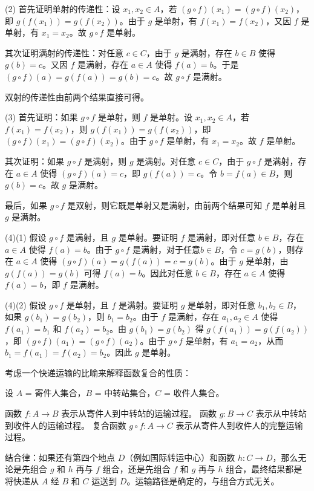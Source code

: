 \documentclass[lang=cn,11pt]{elegantbook}
\begin{document}
(2) 首先证明单射的传递性：设 $x_1, x_2 \in A$，若 $(g \circ f)(x_1) = (g \circ f)(x_2)$，即 $g(f(x_1)) = g(f(x_2))$。由于 $g$ 是单射，有 $f(x_1) = f(x_2)$，又因 $f$ 是单射，有 $x_1 = x_2$。故 $g \circ f$ 是单射。

其次证明满射的传递性：对任意 $c \in C$，由于 $g$ 是满射，存在 $b \in B$ 使得 $g(b) = c$。又因 $f$ 是满射，存在 $a \in A$ 使得 $f(a) = b$。于是 $(g \circ f)(a) = g(f(a)) = g(b) = c$。故 $g \circ f$ 是满射。

双射的传递性由前两个结果直接可得。

(3) 首先证明：如果 $g \circ f$ 是单射，则 $f$ 是单射。设 $x_1, x_2 \in A$，若 $f(x_1) = f(x_2)$，则 $g(f(x_1)) = g(f(x_2))$，即 $(g \circ f)(x_1) = (g \circ f)(x_2)$。由于 $g \circ f$ 是单射，有 $x_1 = x_2$。故 $f$ 是单射。

其次证明：如果 $g \circ f$ 是满射，则 $g$ 是满射。对任意 $c \in C$，由于 $g \circ f$ 是满射，存在 $a \in A$ 使得 $(g \circ f)(a) = c$，即 $g(f(a)) = c$。令 $b = f(a) \in B$，则 $g(b) = c$。故 $g$ 是满射。

最后，如果 $g \circ f$ 是双射，则它既是单射又是满射，由前两个结果可知 $f$ 是单射且 $g$ 是满射。

(4)(1) 假设 $g \circ f$ 是满射，且 $g$ 是单射。要证明 $f$ 是满射，即对任意 $b \in B$，存在 $a \in A$ 使得 $f(a) = b$。由于 $g \circ f$ 是满射，对于任意$b \in B$，令 $c = g(b)$，则存在 $a \in A$ 使得 $(g \circ f)(a) =g(f(a))= c=g(b)$。由于 $g$ 是单射，由 $g(f(a)) = g(b)$ 可得 $f(a) = b$。因此对任意 $b \in B$，存在 $a \in A$ 使得 $f(a) = b$，即 $f$ 是满射。

(4)(2) 假设 $g \circ f$ 是单射，且 $f$ 是满射。要证明 $g$ 是单射，即对任意 $b_1, b_2 \in B$，如果 $g(b_1) = g(b_2)$，则 $b_1 = b_2$。由于 $f$ 是满射，存在 $a_1, a_2 \in A$ 使得 $f(a_1) = b_1$ 和 $f(a_2) = b_2$。由 $g(b_1) = g(b_2)$ 得 $g(f(a_1)) = g(f(a_2))$，即 $(g \circ f)(a_1) = (g \circ f)(a_2)$。由于 $g \circ f$ 是单射，有 $a_1 = a_2$，从而 $b_1 = f(a_1) = f(a_2) = b_2$。因此 $g$ 是单射。
\vspace{20pt}

考虑一个快递运输的比喻来解释函数复合的性质：

设 $A$ = 寄件人集合，$B$ = 中转站集合，$C$ = 收件人集合。

函数 $f: A \to B$ 表示从寄件人到中转站的运输过程。
函数 $g: B \to C$ 表示从中转站到收件人的运输过程。
复合函数 $g \circ f: A \to C$ 表示从寄件人到收件人的完整运输过程。

结合律：如果还有第四个地点 $D$（例如国际转运中心）和函数 $h: C \to D$，那么无论是先组合 $g$ 和 $h$ 再与 $f$ 组合，还是先组合 $f$ 和 $g$ 再与 $h$ 组合，最终结果都是将快递从 $A$ 经 $B$ 和 $C$ 运送到 $D$。运输路径是确定的，与组合方式无关。
\end{document}
